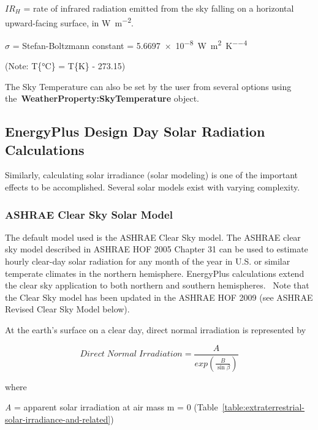 $IR_H$ = rate of infrared radiation emitted from the sky falling on a horizontal upward-facing surface, in \si{\watt\per\meter\squared}.
\newline

$\sigma$ = Stefan-Boltzmann constant = \SI{5.6697e-8}{\watt\per\meter\squared\per\kelvin\tothe{4}}
\newline

(Note: T\{\si{\celsius}\} = T\{\si{\kelvin}\} - 273.15)
\newline

The Sky Temperature can also be set by the user from several options using the~\textbf{WeatherProperty:SkyTemperature} object.

\subsection{EnergyPlus Design Day Solar Radiation Calculations}\label{energyplus-design-day-solar-radiation-calculations}

Similarly, calculating solar irradiance (solar modeling) is one of the important effects to be accomplished. Several solar models exist with varying complexity.

\subsubsection{ASHRAE Clear Sky Solar Model}\label{ashrae-clear-sky-solar-model}

The default model used is the ASHRAE Clear Sky model. The ASHRAE clear sky model described in ASHRAE HOF 2005 Chapter 31 can be used to estimate hourly clear-day solar radiation for any month of the year in U.S. or similar temperate climates in the northern hemisphere. EnergyPlus calculations extend the clear sky application to both northern and southern hemispheres.~ Note that the Clear Sky model has been updated in the ASHRAE HOF 2009 (see ASHRAE Revised Clear Sky Model below).

At the earth's surface on a clear day, direct normal irradiation is represented by

\begin{equation}
Direct\;Normal\;Irradiation = \frac{A}{exp\left( \frac{B}{\sin \beta } \right)}
\label{eq:DirectNormalIrradiation}
\end{equation}

where

\emph{A} = apparent solar irradiation at air mass m = 0 (Table~\ref{table:extraterrestrial-solar-irradiance-and-related})

